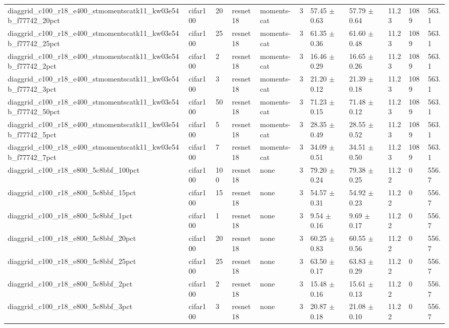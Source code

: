 \begin{tabular}{lllllllllll}
diaggrid_c100_r18_e400_stmomentscatk11_kw03e54b_f77742_20pct & cifar100 & 20 & resnet18 & moments-cat & 3 & 57.45 $\pm$ 0.63 & 57.79 $\pm$ 0.64 & 11.23 & 1089 & 563.1 \\
diaggrid_c100_r18_e400_stmomentscatk11_kw03e54b_f77742_25pct & cifar100 & 25 & resnet18 & moments-cat & 3 & 61.35 $\pm$ 0.36 & 61.60 $\pm$ 0.48 & 11.23 & 1089 & 563.1 \\
diaggrid_c100_r18_e400_stmomentscatk11_kw03e54b_f77742_2pct & cifar100 & 2 & resnet18 & moments-cat & 3 & 16.46 $\pm$ 0.29 & 16.65 $\pm$ 0.26 & 11.23 & 1089 & 563.1 \\
diaggrid_c100_r18_e400_stmomentscatk11_kw03e54b_f77742_3pct & cifar100 & 3 & resnet18 & moments-cat & 3 & 21.20 $\pm$ 0.12 & 21.39 $\pm$ 0.18 & 11.23 & 1089 & 563.1 \\
diaggrid_c100_r18_e400_stmomentscatk11_kw03e54b_f77742_50pct & cifar100 & 50 & resnet18 & moments-cat & 3 & 71.23 $\pm$ 0.15 & 71.48 $\pm$ 0.12 & 11.23 & 1089 & 563.1 \\
diaggrid_c100_r18_e400_stmomentscatk11_kw03e54b_f77742_5pct & cifar100 & 5 & resnet18 & moments-cat & 3 & 28.35 $\pm$ 0.49 & 28.55 $\pm$ 0.52 & 11.23 & 1089 & 563.1 \\
diaggrid_c100_r18_e400_stmomentscatk11_kw03e54b_f77742_7pct & cifar100 & 7 & resnet18 & moments-cat & 3 & 34.09 $\pm$ 0.51 & 34.51 $\pm$ 0.50 & 11.23 & 1089 & 563.1 \\
diaggrid_c100_r18_e800_5c8bbf_100pct & cifar100 & 100 & resnet18 & none & 3 & 79.20 $\pm$ 0.24 & 79.38 $\pm$ 0.25 & 11.22 & 0 & 556.7 \\
diaggrid_c100_r18_e800_5c8bbf_15pct & cifar100 & 15 & resnet18 & none & 3 & 54.57 $\pm$ 0.31 & 54.92 $\pm$ 0.23 & 11.22 & 0 & 556.7 \\
diaggrid_c100_r18_e800_5c8bbf_1pct & cifar100 & 1 & resnet18 & none & 3 & 9.54 $\pm$ 0.16 & 9.69 $\pm$ 0.17 & 11.22 & 0 & 556.7 \\
diaggrid_c100_r18_e800_5c8bbf_20pct & cifar100 & 20 & resnet18 & none & 3 & 60.25 $\pm$ 0.83 & 60.55 $\pm$ 0.56 & 11.22 & 0 & 556.7 \\
diaggrid_c100_r18_e800_5c8bbf_25pct & cifar100 & 25 & resnet18 & none & 3 & 63.50 $\pm$ 0.17 & 63.83 $\pm$ 0.29 & 11.22 & 0 & 556.7 \\
diaggrid_c100_r18_e800_5c8bbf_2pct & cifar100 & 2 & resnet18 & none & 3 & 15.48 $\pm$ 0.16 & 15.61 $\pm$ 0.13 & 11.22 & 0 & 556.7 \\
diaggrid_c100_r18_e800_5c8bbf_3pct & cifar100 & 3 & resnet18 & none & 3 & 20.87 $\pm$ 0.18 & 21.08 $\pm$ 0.10 & 11.22 & 0 & 556.7 \\

\end{tabular}
